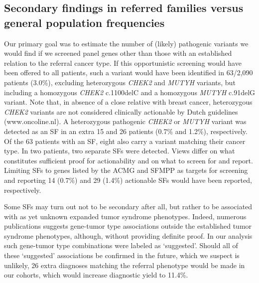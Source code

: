 \subsection[Secondary findings in families vs general population]{Secondary findings in referred families versus general population frequencies}
Our primary goal was to estimate the number of (likely) pathogenic variants we would find if we screened panel genes other than those with an established relation to the referral cancer type. 
If this opportunistic screening would have been offered to all patients, such a variant would have been identified in 63/2,090 patients (3.0\%), excluding heterozygous \textsl{CHEK2} and \textsl{MUTYH} variants, but including a homozygous \textsl{CHEK2} c.1100delC and a homozygous \textsl{MUTYH} c.91delG variant. 
Note that, in absence of a close relative with breast cancer, heterozygous \textsl{CHEK2} variants are not considered clinically actionable by Dutch guidelines (www.oncoline.nl). 
A heterozygous pathogenic \textsl{CHEK2} or \textsl{MUTYH} variant was detected as an SF in an extra 15 and 26 patients (0.7\% and 1.2\%), respectively. 
Of the 63 patients with an SF, eight also carry a variant matching their cancer type. In two patients, two separate SFs were detected. 
Views differ on what constitutes sufficient proof for actionability and on what to screen for and report. 
Limiting SFs to genes listed by the ACMG and SFMPP as targets for screening and reporting 14 (0.7\%) and 29 (1.4\%) actionable SFs would have been reported, respectively. 

Some SFs may turn out not to be secondary after all, but rather to be associated with as yet unknown expanded tumor syndrome phenotypes. 
Indeed, numerous publications suggests gene-tumor type associations outside the established tumor syndrome phenotypes, although, without providing definite proof. 
In our analysis such gene-tumor type combinations were labeled as ‘suggested’. 
Should all of these ‘suggested’ associations be confirmed in the future, which we suspect is unlikely, 26 extra diagnoses matching the referral phenotype would be made in our cohorts, which would increase diagnostic yield to 11.4\%. 

